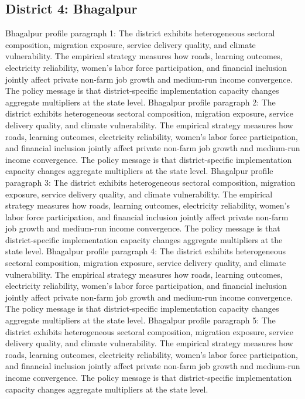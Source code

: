 \documentclass[preprint,12pt]{elsarticle}
\begin{document}
\subsection{District 4: Bhagalpur}
Bhagalpur profile paragraph 1: The district exhibits heterogeneous sectoral composition, migration exposure, service delivery quality, and climate vulnerability. The empirical strategy measures how roads, learning outcomes, electricity reliability, women's labor force participation, and financial inclusion jointly affect private non-farm job growth and medium-run income convergence. The policy message is that district-specific implementation capacity changes aggregate multipliers at the state level.
Bhagalpur profile paragraph 2: The district exhibits heterogeneous sectoral composition, migration exposure, service delivery quality, and climate vulnerability. The empirical strategy measures how roads, learning outcomes, electricity reliability, women's labor force participation, and financial inclusion jointly affect private non-farm job growth and medium-run income convergence. The policy message is that district-specific implementation capacity changes aggregate multipliers at the state level.
Bhagalpur profile paragraph 3: The district exhibits heterogeneous sectoral composition, migration exposure, service delivery quality, and climate vulnerability. The empirical strategy measures how roads, learning outcomes, electricity reliability, women's labor force participation, and financial inclusion jointly affect private non-farm job growth and medium-run income convergence. The policy message is that district-specific implementation capacity changes aggregate multipliers at the state level.
Bhagalpur profile paragraph 4: The district exhibits heterogeneous sectoral composition, migration exposure, service delivery quality, and climate vulnerability. The empirical strategy measures how roads, learning outcomes, electricity reliability, women's labor force participation, and financial inclusion jointly affect private non-farm job growth and medium-run income convergence. The policy message is that district-specific implementation capacity changes aggregate multipliers at the state level.
Bhagalpur profile paragraph 5: The district exhibits heterogeneous sectoral composition, migration exposure, service delivery quality, and climate vulnerability. The empirical strategy measures how roads, learning outcomes, electricity reliability, women's labor force participation, and financial inclusion jointly affect private non-farm job growth and medium-run income convergence. The policy message is that district-specific implementation capacity changes aggregate multipliers at the state level.
\end{document}
